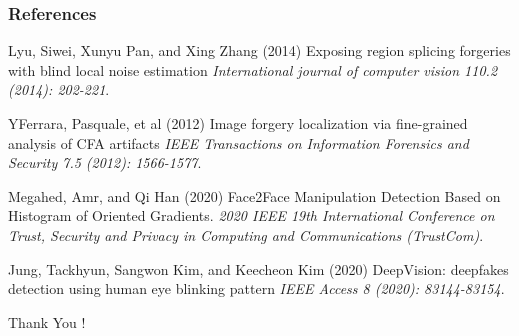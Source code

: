 \documentclass{beamer}
\begin{document}
\begin{frame}
	\frametitle{References}
	\footnotesize{
		\begin{thebibliography}{99} %
			 Lyu, Siwei, Xunyu Pan, and Xing Zhang (2014)
			\newblock Exposing region splicing forgeries with blind local noise estimation
			\newblock \emph{International journal of computer vision 110.2 (2014): 202-221}.
			
			 YFerrara, Pasquale, et al (2012)
			\newblock Image forgery localization via fine-grained analysis of CFA artifacts
			\newblock \emph{IEEE Transactions on Information Forensics and Security 7.5 (2012): 1566-1577}.
			
			Megahed, Amr, and Qi Han (2020)
			\newblock Face2Face Manipulation Detection Based on Histogram of Oriented Gradients.
			\newblock \emph{2020 IEEE 19th International Conference on Trust, Security and Privacy in Computing and Communications (TrustCom)}.
			
			Jung, Tackhyun, Sangwon Kim, and Keecheon Kim (2020)
			\newblock DeepVision: deepfakes detection using human eye blinking pattern
			\newblock \emph{IEEE Access 8 (2020): 83144-83154}.
		\end{thebibliography}
	}
\end{frame}
\begin{frame}
\Huge{\centerline{Thank You !}}
\end{frame}

\end{document}
